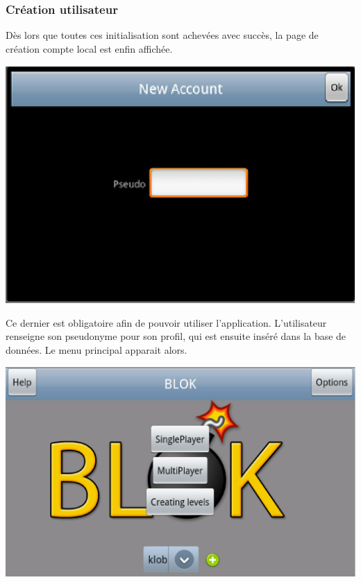 	\subsubsection{Création utilisateur}
	Dès lors que toutes ces initialisation sont achevées avec succès, la page de
	création compte local est enfin affichée.
		\begin{center}						
			\includegraphics[scale=0.6]{Developpement/Img/2.eps}
		\end{center} 
	Ce dernier est obligatoire afin de pouvoir utiliser l'application. L'utilisateur renseigne son pseudonyme
	pour son profil, qui est ensuite inséré dans la base de données.
	Le menu principal apparait alors.
	\begin{center}						
			\includegraphics[scale=0.3]{Developpement/Img/3.eps}
		\end{center} 
	
